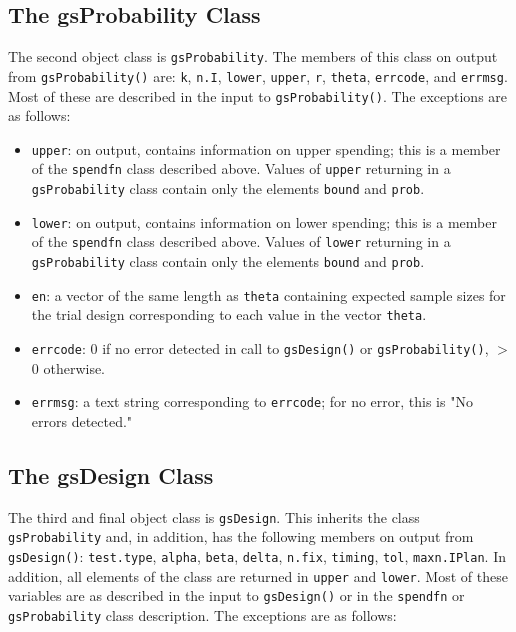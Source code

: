 \subsection{The gsProbability Class}

\bigskip

The second object class is \texttt{gsProbability}. The members of this class 
on output from \texttt{gsProbability()} are: \texttt{k}, \texttt{n.I}, 
\texttt{lower}, \texttt{upper}, \texttt{r}, \texttt{theta}, \texttt{errcode}, 
and \texttt{errmsg}. Most of these are described in the input to
\texttt{gsProbability()}. The exceptions are as follows:

\begin{itemize}
\item \texttt{upper}: on output, contains information on upper spending;
this is a member of the \texttt{spendfn} class described above. Values of
\texttt{upper} returning in a \texttt{gsProbability} class contain only the
elements \texttt{bound} and \texttt{prob}.

\item \texttt{lower}: on output, contains information on lower spending;
this is a member of the \texttt{spendfn} class described above. Values of
\texttt{lower} returning in a \texttt{gsProbability} class contain only the
elements \texttt{bound} and \texttt{prob}.

\item \texttt{en}: a vector of the same length as \texttt{theta} containing
expected sample sizes for the trial design corresponding to each value in the
vector \texttt{theta}.

\item \texttt{errcode}: 0 if no error detected in call to
\texttt{gsDesign()} or \texttt{gsProbability()},
$>$
0 otherwise.

\item \texttt{errmsg}: a text string corresponding to \texttt{errcode}; for
no error, this is "No errors detected."
\end{itemize}

\subsection{The gsDesign Class}

The third and final object class is \texttt{gsDesign}. This inherits the class
\texttt{gsProbability} and, in addition, has the following members on output from
\texttt{gsDesign()}: \texttt{test.type}, \texttt{alpha}, \texttt{beta},
\texttt{delta}, \texttt{n.fix}, \texttt{timing}, \texttt{tol}, 
\texttt{maxn.IPlan}. In
addition, all elements of the class 
 are returned in \texttt{upper} and
\texttt{lower}. Most of these variables are as described in the input to
\texttt{gsDesign()} or in the \texttt{spendfn} or \texttt{gsProbability} 
class description. The exceptions are as follows:

